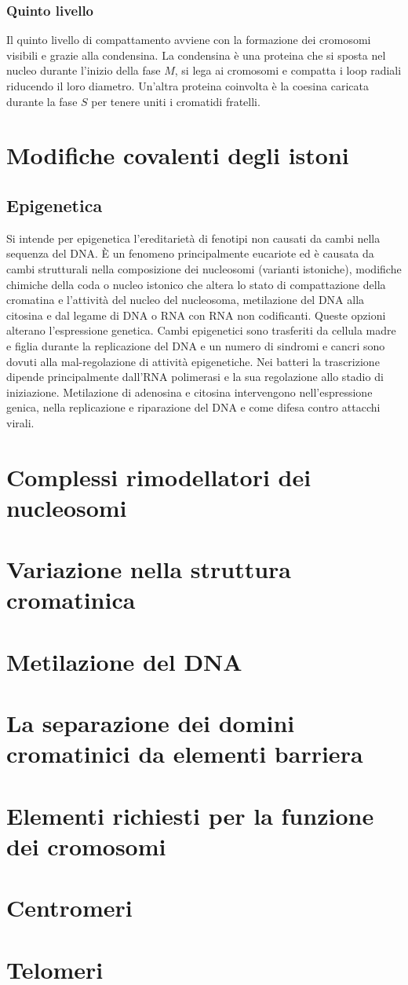 \subsubsection{Quinto livello}
Il quinto livello di compattamento avviene con la formazione dei cromosomi visibili e grazie alla condensina. La condensina \`e una proteina che si sposta nel nucleo durante l'inizio 
della fase $M$, si lega ai cromosomi e compatta i loop radiali riducendo il loro diametro. Un'altra proteina coinvolta \`e la coesina caricata durante la fase $S$ per tenere uniti i 
cromatidi fratelli. 
\section{Modifiche covalenti degli istoni}
\subsection{Epigenetica}
Si intende per epigenetica l'ereditariet\`a di fenotipi non causati da cambi nella sequenza del DNA. \`E un fenomeno principalmente eucariote ed \`e causata da cambi strutturali
nella composizione dei nucleosomi (varianti istoniche), modifiche chimiche della coda o nucleo istonico che altera lo stato di compattazione della cromatina e l'attivit\`a del nucleo
del nucleosoma, metilazione del DNA alla citosina e dal legame di DNA o RNA con RNA non codificanti. Queste opzioni alterano l'espressione genetica. Cambi epigenetici sono 
trasferiti da cellula madre e figlia durante la replicazione del DNA e un numero di sindromi e cancri sono dovuti alla mal-regolazione di attivit\`a epigenetiche. Nei batteri la
trascrizione dipende principalmente dall'RNA polimerasi e la sua regolazione allo stadio di iniziazione. Metilazione di adenosina e citosina intervengono nell'espressione genica, 
nella replicazione e riparazione del DNA e come difesa contro attacchi virali. 
\section{Complessi rimodellatori dei nucleosomi}

\section{Variazione nella struttura cromatinica}

\section{Metilazione del DNA}

\section{La separazione dei domini cromatinici da elementi barriera}

\section{Elementi richiesti per la funzione dei cromosomi}

\section{Centromeri}

\section{Telomeri}
